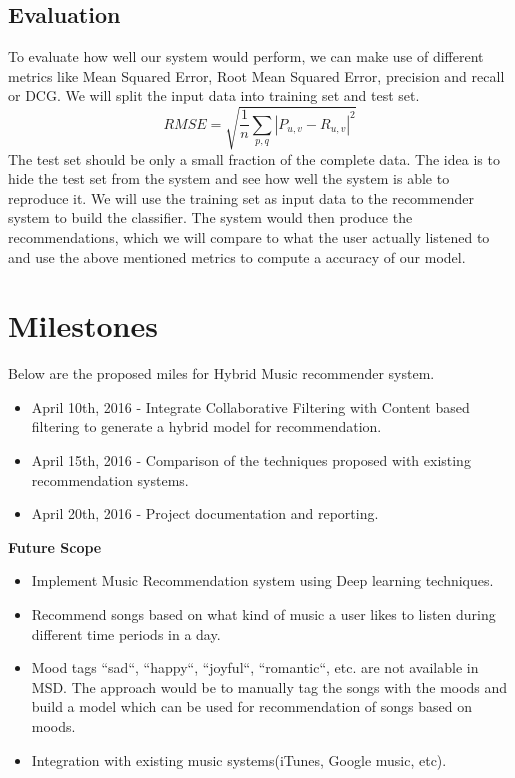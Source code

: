 \documentclass{sig-alternate-05-2015}
\begin{document}
\subsection{Evaluation}
To evaluate how well our system would perform, we can make use of different metrics like Mean Squared Error, Root Mean Squared Error, precision and recall or DCG. We will split the input data into training set and test set. \\
\begin{equation*}
    RMSE = \sqrt{\frac{1}{n}\sum_{p,q}|{P_{u,v}}- {R_{u,v}}|^2}
\end{equation*}
The test set should be only a small fraction of the complete data. The idea is to hide the test set from the system and see how well the system is able to reproduce it. We will use the training set as input data to the recommender system to build the classifier. The system would then produce the recommendations, which we will compare to what the user actually listened to and use the above mentioned metrics to compute a accuracy of our model.


\section{Milestones}
Below are the proposed miles for Hybrid Music recommender system.
\begin{itemize}
\item April 10th, 2016 - Integrate Collaborative Filtering with Content based filtering to generate a hybrid model for recommendation.

\item April 15th, 2016 - Comparison of the techniques proposed with existing recommendation systems.

\item April 20th, 2016 - Project documentation and reporting.
\end{itemize}

\textbf{Future Scope}
\begin{itemize}
    \item Implement Music Recommendation system using Deep learning techniques.
    \item Recommend songs based on what kind of music a user likes to listen during different time periods in a day.
    \item Mood tags ``sad``, ``happy``, ``joyful``, ``romantic``, etc. are not available in MSD. The approach would be to manually tag the songs with the moods and build a model which can be used for recommendation of songs based on moods. \\
    \item Integration with existing music systems(iTunes, Google music, etc). \\
\end{itemize}
\end{document}
